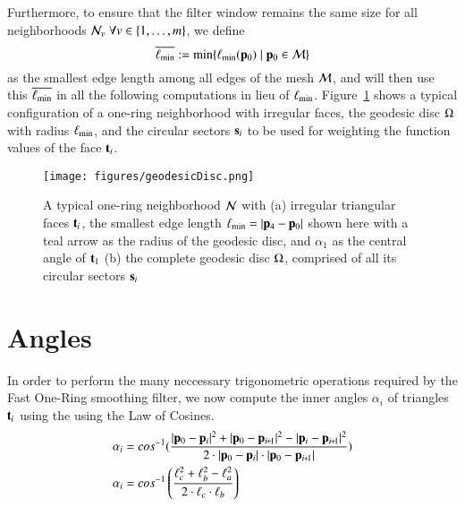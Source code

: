 Furthermore, to ensure that the filter window remains the same size for all neighborhoods $\mathcal{N}_v\;\forall v \in \{1,\ldots,m\}$, we define
\begin{equation}
	\overline{\ell_\text{min}} := \min\{\ell_\text{min}(\mathbf{p}_0) \;|\; \mathbf{p}_0 \in \mathcal{M}\}
	\label{eq:globalMinimumEdgeLength}
\end{equation}%
%
as the smallest edge length among all edges of the mesh $\mathcal{M}$, and will then use this $\overline{\ell_\text{min}}$ in all the following computations in lieu of $\ell_\text{min}$.
%
Figure~\ref{fig:geodesicDisc} shows a typical configuration of a one-ring neighborhood with irregular faces, the geodesic disc $\Omega$ with radius $\ell_\text{min}$, and the circular sectors $\mathbf{s}_i$ to be used for weighting the function values of the face $\mathbf{t}_i$.
\begin{figure}[ht]
\ffigbox
	{\texttt{[image: figures/geodesicDisc.png]}}
	{\caption[One-ring and geodesic disc]{A typical one-ring neighborhood $\mathcal{N}$ with (a) irregular triangular faces $\mathbf{t}_i$, the smallest edge length $\ell_\text{min} = |\mathbf{p}_4 - \mathbf{p}_0|$ shown here with a teal arrow as the radius of the geodesic disc, and $\alpha_1$ as the central angle of $\mathbf{t}_1$ (b) the complete geodesic disc $\Omega$, comprised of all its circular sectors $\mathbf{s}_i$}\label{fig:geodesicDisc}}
\end{figure}%
%
%
%
%
%
%
%
\section{Angles}
\label{ch4sA}
In order to perform the many neccessary trigonometric operations required by the Fast One-Ring smoothing filter, we now compute the inner angles $\alpha_i$ of triangles $\mathbf{t}_i$ using the using the Law of Cosines. 
\begin{align}
	\alpha_i & = cos^{-1}(\frac{|\bp_0 - \bp_{i}|^2 + |\bp_0 - \bp_{\sipo}|^2 - |\bp_i - \bp_{\sipo}|^2}{2\cdot|\bp_0 - \bp_{i}|\cdot|\bp_0 - \bp_{\sipo}|}) \\
	\alpha_i & = cos^{-1}\left (\frac{\ell_c^2 + \ell_b^2 - \ell_a^2}{2\cdot\ell_c\cdot\ell_b}\right )
	\label{eq:alphaFromEdgeLengths}
\end{align}%
%

